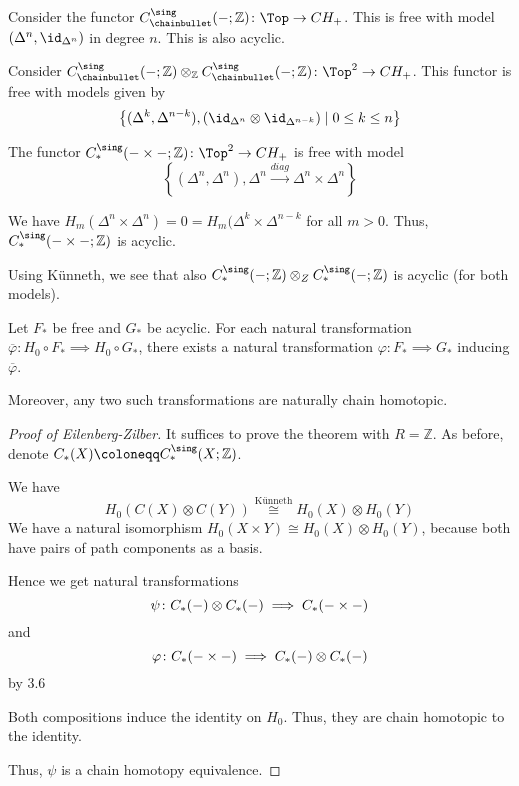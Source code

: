 \begin{example}
  Consider the functor
  $C_\chainbullet ^{\sing}(\blank ; \mathbb{Z})\colon \Top \to CH_+$.
  This is free with model $(\Delta^n, \id_{\Delta^n})$ in degree $n$.
  This is also acyclic.
\end{example}

\begin{example}
  Consider
  $C_\chainbullet ^{\sing}(\blank ; \mathbb{Z}) \otimes _{\mathbb{Z}} C_\chainbullet ^{\sing}
  (\blank ; \mathbb{Z}) \colon  \Top^2 \to  CH_+$.
  This functor is free with models given by
  \[
    \left\{(\Delta^k, \Delta^{n-k}), (\id_{\Delta^n} \otimes \id_{\Delta^{n-k}}) 
    \mid  0 \leq  k \leq  n\right\} 
  \]

  The functor $C_*^{\sing}(\blank \times  \blank ; \mathbb{Z}) \colon  \Top^2\to CH_+$
  is free with model
  \[
    \left\{(\Delta^n, \Delta^n), \Delta^n \xrightarrow{diag} \Delta^n \times \Delta^n \right\} 
  \]

  We have $H_m(\Delta^n \times \Delta^n) = 0 = H_m(\Delta^k \times \Delta^{n-k}$ 
  for all $m>0$.
  Thus,  $C_*^{\sing}(- \times - ; \mathbb{Z})$ is acyclic.

  Using Künneth, we see that also
  $C_*^{\sing}( \blank ; \mathbb{Z}) \otimes _Z C_*^{\sing} (\blank ; \mathbb{Z})$ 
  is acyclic (for both models).
\end{example}

\begin{theorem}
  Let $F_*$ be free and  $G_*$ be acyclic.
  For each natural transformation
  $\overline{\varphi } \colon  H_0 \circ  F_*
  \implies H_0 \circ  G_*$,
  there exists a natural transformation $\varphi \colon F_* \implies G_*$
  inducing $\overline{\varphi }$.

  Moreover, any two such transformations are naturally chain homotopic.
\end{theorem}


\begin{proof}[Proof of Eilenberg-Zilber]
  It suffices to prove the theorem with $R = \mathbb{Z}$.
  As before, denote $C_*(X) \coloneqq C_*^{\sing}(X ; \mathbb{Z})$.

  We have
  \[
    H_0(C(X) \otimes C(Y))
    \stackrel{\text{Künneth}}{\cong}
    H_0(X) \otimes H_0(Y)
  \]
  We have a natural isomorphism
  $H_0(X \times Y) \cong H_0(X) \otimes H_0(Y)$,
  because both have pairs of path components as a basis.

  Hence we get natural transformations
  \[
    \psi \colon  C_*(-) \otimes C_*(-) \implies C_*( - \times  - )
  \]
  and
  \[
  \varphi  \colon  C_*( - \times  - ) \implies C_* ( - ) \otimes  C_* ( - )
  \]
  by 3.6

  Both compositions induce the identity on $H_0$.
  Thus, they are chain homotopic to the identity.

  Thus, $\psi $ is a chain homotopy equivalence.
\end{proof}

